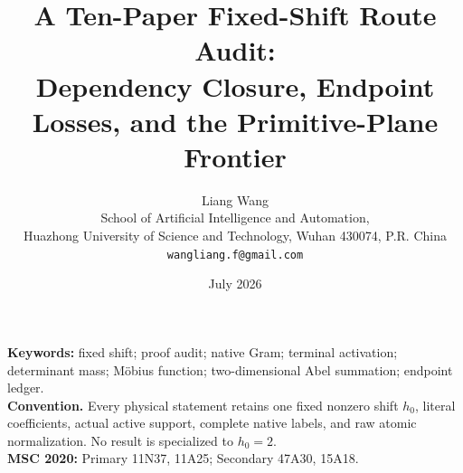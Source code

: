 \documentclass[11pt]{article}
\title{A Ten-Paper Fixed-Shift Route Audit:\\
Dependency Closure, Endpoint Losses, and the Primitive-Plane Frontier}
\author{Liang Wang\\
School of Artificial Intelligence and Automation,\\
Huazhong University of Science and Technology, Wuhan 430074, P.R. China\\
\texttt{wangliang.f@gmail.com}}
\date{July 2026}
\theoremstyle{remark}
\begin{document}
\maketitle


\noindent\textbf{Keywords:} fixed shift; proof audit; native Gram;
terminal activation; determinant mass; M\"obius function;
two-dimensional Abel summation; endpoint ledger.\\[0.5em]
\noindent\textbf{Convention.} Every physical statement retains one fixed
nonzero shift \(h_0\), literal coefficients, actual active support, complete
native labels, and raw atomic normalization.  No result is specialized to
\(h_0=2\).\\[0.5em]
\noindent\textbf{MSC 2020:} Primary 11N37, 11A25; Secondary 47A30, 15A18.














\begingroup
\small
\raggedright


\endgroup
\end{document}
